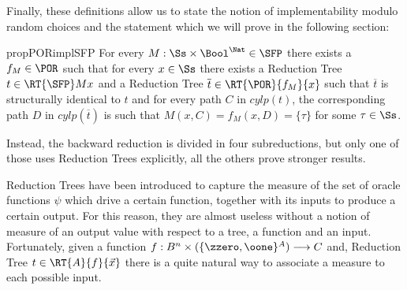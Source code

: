 \begin{conditional}{\notappendix}

  Finally, these definitions allow us to state the notion of implementability
  modulo random choices and the statement which we will prove
  in the following section:

\begin{restatable}{prop}{PORimplSFP}
  \label{prop:PORimplSFP}
  For every $M: \Ss \times \Bool^\Nat \in \SFP$ there exists a $f_M \in \POR$ such that
  for every $x \in \Ss$ there exists a Reduction Tree $t \in \RT{\SFP} M x$ and a
  Reduction Tree $\overline t \in \RT{\POR} {f_M} {x}$ such that $\overline t$
  is structurally identical to $t$ and for every path $C$ in $\mathit{cylp}(t)$,
  the corresponding path $D$ in $\mathit{cylp}(\overline t)$ is such that
  $M(x, C) = f_M(x, D) = \{\tau\}$ for some $\tau\in \Ss$.
\end{restatable}

  Instead, the backward reduction is divided in four subreductions, but only one
  of those uses Reduction Trees explicitly, all the others prove stronger results.


  Reduction Trees have been introduced to capture the measure of the set of
  oracle functions $\psi$ which drive a certain function, together with its
  inputs to produce a certain output. For this reason, they are almost
  useless without a notion of measure of an output value with
  respect to a tree, a function and an input.
  Fortunately, given a function
  $f: B^n\times (\{\zzero, \oone\}^A)\longrightarrow C$
  and, Reduction Tree $t \in \RT{A} {f} {\vec x}$ there is a quite
  natural way to associate a measure to each possible input.


\end{conditional}
